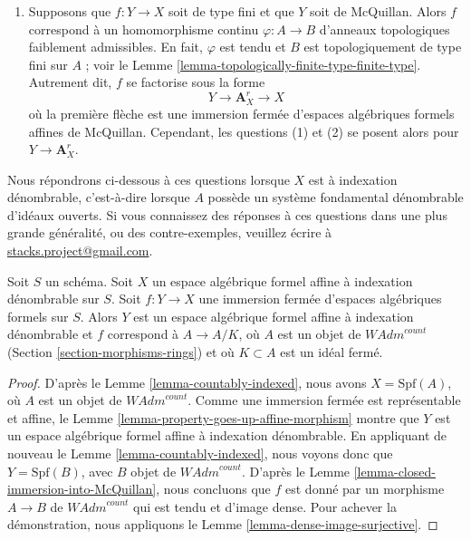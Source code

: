 \begin{remark}
\begin{enumerate}
Cependant, il n'est pas clair que les projections
$\lim B_\lambda \to B_\lambda$ soient surjectives ; autrement dit,
il n'est pas clair que $Y$ soit de McQuillan.
Existe-t-il un exemple où $Y$ n'est pas de McQuillan ?
\item Supposons que $f : Y \to X$ soit de type fini et que $Y$ soit de McQuillan.
Alors $f$ correspond à un homomorphisme continu $\varphi : A \to B$ d'anneaux topologiques
faiblement admissibles. En fait, $\varphi$ est tendu et
$B$ est topologiquement de type fini sur $A$ ; voir le
Lemme \ref{lemma-topologically-finite-type-finite-type}.
Autrement dit, $f$ se factorise sous la forme
$$
Y \longrightarrow \mathbf{A}^r_X \longrightarrow X
$$
où la première flèche est une immersion fermée d'espaces algébriques formels
affines de McQuillan. Cependant, les questions (1) et
(2) se posent alors pour $Y \to \mathbf{A}^r_X$.
\end{enumerate}
Nous répondrons ci-dessous à ces questions lorsque
$X$ est à indexation dénombrable, c'est-à-dire lorsque $A$ possède un système fondamental
dénombrable d'idéaux ouverts. Si vous connaissez des réponses à ces questions
dans une plus grande généralité, ou des contre-exemples, veuillez écrire à
\href{mailto:stacks.project@gmail.com}{stacks.project@gmail.com}.
\end{remark}

\begin{lemma}
\label{lemma-closed-immersion-into-countably-indexed}
Soit $S$ un schéma. Soit $X$ un espace algébrique formel affine à indexation
dénombrable sur $S$. Soit $f : Y \to X$ une immersion fermée d'espaces algébriques
formels sur $S$. Alors $Y$ est un espace algébrique formel affine à indexation dénombrable
et $f$ correspond à $A \to A/K$, où $A$ est un objet de
$\textit{WAdm}^{count}$
(Section \ref{section-morphisms-rings})
et où $K \subset A$ est un idéal fermé.
\end{lemma}

\begin{proof}
D'après le Lemme \ref{lemma-countably-indexed},
nous avons $X = \text{Spf}(A)$, où $A$ est un objet de
$\textit{WAdm}^{count}$. Comme une immersion fermée est représentable
et affine, le Lemme \ref{lemma-property-goes-up-affine-morphism} montre
que $Y$ est un espace algébrique formel affine à indexation dénombrable.
En appliquant de nouveau le Lemme \ref{lemma-countably-indexed},
nous voyons donc que $Y = \text{Spf}(B)$, avec $B$ objet de
$\textit{WAdm}^{count}$. D'après le Lemme \ref{lemma-closed-immersion-into-McQuillan},
nous concluons que $f$ est donné par un morphisme $A \to B$ de
$\textit{WAdm}^{count}$ qui est tendu et d'image dense.
Pour achever la démonstration, nous appliquons le
Lemme \ref{lemma-dense-image-surjective}.
\end{proof}


